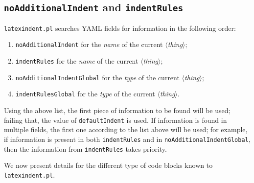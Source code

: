 \subsection{\texttt{noAdditionalIndent} and \texttt{indentRules}}\label{sec:noadd-indent-rules}
\texttt{latexindent.pl} searches YAML fields for information in the following order:
\begin{enumerate}
  \item \texttt{noAdditionalIndent} for the \emph{name} of the current \emph{$\langle$thing$\rangle$};
  \item \texttt{indentRules} for the \emph{name} of the current \emph{$\langle$thing$\rangle$};
  \item \texttt{noAdditionalIndentGlobal} for the \emph{type} of the current \emph{$\langle$thing$\rangle$};
  \item \texttt{indentRulesGlobal} for the \emph{type} of the current \emph{$\langle$thing$\rangle$}.
\end{enumerate}

Using the above list, the first piece of information to be found will be used; failing that,  
the value of \texttt{defaultIndent} is used.
If information is found in multiple fields, the first one according to the list above will be used; for example, 
if information is present in both \texttt{indentRules} and in \texttt{noAdditionalIndentGlobal}, then the information from \texttt{indentRules}
takes priority.

We now present details for the different type of code blocks known to \texttt{latexindent.pl}.
